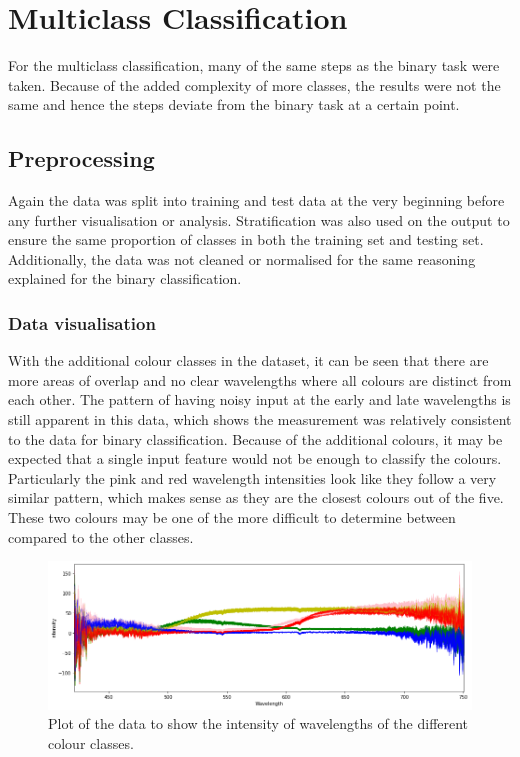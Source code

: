 \documentclass{article}
\begin{document}
\section{Multiclass Classification}
For the multiclass classification, many of the same steps as the binary task were taken. Because of the added complexity of more classes, the results were not the same and hence the steps deviate from the binary task at a certain point. 

\subsection{Preprocessing}
Again the data was split into training and test data at the very beginning before any further visualisation or analysis. Stratification was also used on the output to ensure the same proportion of classes in both the training set and testing set. Additionally, the data was not cleaned or normalised for the same reasoning explained for the binary classification.
\subsubsection{Data visualisation}
With the additional colour classes in the dataset, it can be seen that there are more areas of overlap and no clear wavelengths where all colours are distinct from each other. The pattern of having noisy input at the early and late wavelengths is still apparent in this data, which shows the measurement was relatively consistent to the data for binary classification. Because of the additional colours, it may be expected that a single input feature would not be enough to classify the colours. Particularly the pink and red wavelength intensities look like they follow a very similar pattern, which makes sense as they are the closest colours out of the five. These two colours may be one of the more difficult to determine between compared to the other classes.
\begin{figure}[H]
\centering
\includegraphics[width=1\textwidth, keepaspectratio]{imgs/multiclass-visual.png}
\caption{Plot of the data to show the intensity of wavelengths of the different colour classes.}
\label{fig:multiclass-visualisation}
\end{figure}
\end{document}
